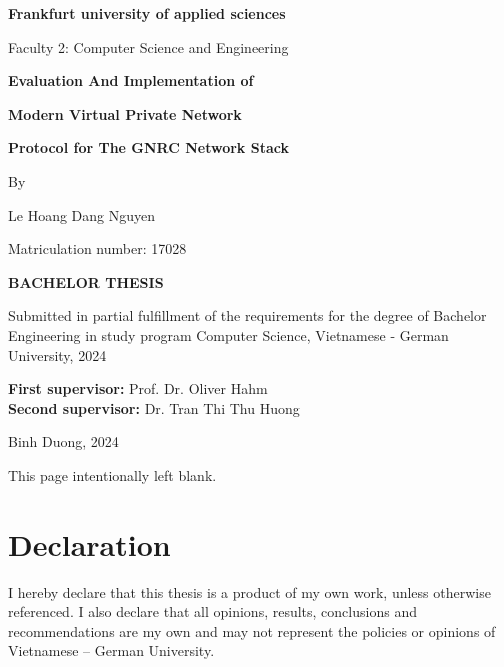 \documentclass[12pt,twoside]{report}
\begin{document}
\begin{titlepage}
\begin{center}
    \textbf{Frankfurt university of applied sciences}

    \vspace*{0.5cm}

    Faculty 2: Computer Science and Engineering

    \vspace{1cm}

    \textbf{\LARGE 
    Evaluation And Implementation of}
    \vspace{0.3cm}

    \textbf {\LARGE Modern Virtual Private Network }

    \vspace{0.3cm}
    \textbf{\LARGE Protocol for The GNRC Network Stack}

    \vspace{0.8cm}
    \large By
    \vspace{0.2cm}

    \large Le Hoang Dang Nguyen
    \vspace{0.2cm}

    \large Matriculation number: 17028

    \vspace{0.7cm}
    \textbf{\uppercase{Bachelor Thesis}}

    \vspace{0.7cm}
    Submitted in partial fulfillment of the requirements for the degree of 
    Bachelor Engineering in study program Computer Science, Vietnamese - German University, 2024
    \vspace{1cm}

      \textbf{First supervisor:} Prof. Dr. Oliver Hahm \\
      \textbf{Second supervisor:} Dr. Tran Thi Thu Huong

    \vfill

    Binh Duong, 2024

  \end{center}
\end{titlepage}

\newpage  %
\thispagestyle{empty}  %
\hbox{}  %
\vfill  %
\begin{center}
\Large This page intentionally left blank.
\end{center}
\vfill  %

\newpage  %

\chapter *{\centering Declaration}
\doublespacing
\large I hereby declare that this thesis is a product of my own work, unless
otherwise referenced. I also declare that all opinions, results, conclusions
and recommendations are my own and may not represent the policies or
opinions of Vietnamese – German University.
\end{document}
